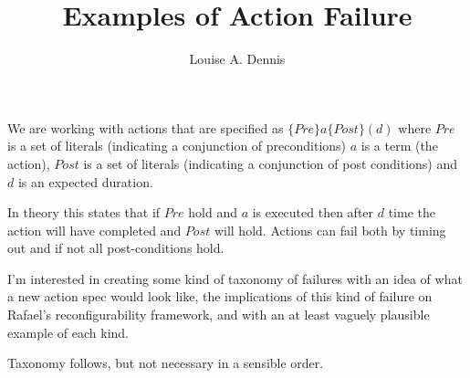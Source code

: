 \documentclass{blue-book}
\title{Examples of Action Failure}
\author{Louise A. Dennis}
\newcommand{\actionspec}[4]{\ensuremath{\{#1\}#2\{#3\}(#4)}}
\begin{document}
\maketitle

We are working with actions that are specified as \actionspec{Pre}{a}{Post}{d} where $Pre$ is a set of literals (indicating a conjunction of preconditions) $a$ is a term (the action), $Post$ is a set of literals (indicating a conjunction of post conditions) and $d$ is an expected duration.

In theory this states that if $Pre$ hold and $a$ is executed then after $d$ time the action will have completed and $Post$ will hold.  Actions can fail both by timing out and if not all post-conditions hold.

I'm interested in creating some kind of taxonomy of failures with an idea of what a new action spec would look like, the implications of this kind of failure on Rafael's reconfigurability framework, and with an at least vaguely plausible example of each kind.  

Taxonomy follows, but not necessary in a sensible order.
\end{document}
